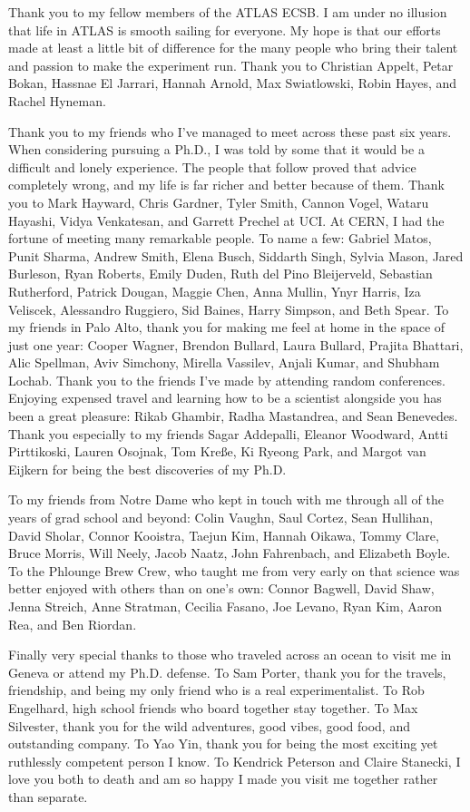 {  Thank you to my fellow members of the ATLAS ECSB.
  I am under no illusion that life in ATLAS is smooth sailing for everyone.
  My hope is that our efforts made at least a little bit of difference for the many people who bring their talent and passion to make the experiment run.
  Thank you to Christian Appelt, Petar Bokan, Hassnae El Jarrari, Hannah Arnold, Max Swiatlowski, Robin Hayes, and Rachel Hyneman.

  Thank you to my friends who I've managed to meet across these past six years.
  When considering pursuing a Ph.D., I was told by some that it would be a difficult and lonely experience.
  The people that follow proved that advice completely wrong, and my life is far richer and better because of them.
  Thank you to Mark Hayward, Chris Gardner, Tyler Smith, Cannon Vogel, Wataru Hayashi, Vidya Venkatesan, and Garrett Prechel at UCI.
  At CERN, I had the fortune of meeting many remarkable people.
  To name a few: Gabriel Matos, Punit Sharma, Andrew Smith, Elena Busch, Siddarth Singh, Sylvia Mason, Jared Burleson, Ryan Roberts, Emily Duden, Ruth del Pino Bleijerveld, Sebastian Rutherford, Patrick Dougan, Maggie Chen, Anna Mullin, Ynyr Harris, Iza Veliscek, Alessandro Ruggiero, Sid Baines, Harry Simpson, and Beth Spear.
  To my friends in Palo Alto, thank you for making me feel at home in the space of just one year: Cooper Wagner, Brendon Bullard, Laura Bullard, Prajita Bhattari, Alic Spellman, Aviv Simchony, Mirella Vassilev, Anjali Kumar, and Shubham Lochab.
  Thank you to the friends I've made by attending random conferences.
  Enjoying expensed travel and learning how to be a scientist alongside you has been a great pleasure: Rikab Ghambir, Radha Mastandrea, and Sean Benevedes.
  Thank you especially to my friends Sagar Addepalli, Eleanor Woodward, Antti Pirttikoski, Lauren Osojnak, Tom Kreße, Ki Ryeong Park, and Margot van Eijkern for being the best discoveries of my Ph.D.

  To my friends from Notre Dame who kept in touch with me through all of the years of grad school and beyond: Colin Vaughn, Saul Cortez, Sean Hullihan, David Sholar, Connor Kooistra, Taejun Kim, Hannah Oikawa, Tommy Clare, Bruce Morris, Will Neely, Jacob Naatz, John Fahrenbach, and Elizabeth Boyle.
  To the Phlounge Brew Crew, who taught me from very early on that science was better enjoyed with others than on one's own: Connor Bagwell, David Shaw, Jenna Streich, Anne Stratman, Cecilia Fasano, Joe Levano, Ryan Kim, Aaron Rea, and Ben Riordan.

  Finally very special thanks to those who traveled across an ocean to visit me in Geneva or attend my Ph.D. defense.
  To Sam Porter, thank you for the travels, friendship, and being my only friend who is a real experimentalist.
  To Rob Engelhard, high school friends who board together stay together.
  To Max Silvester, thank you for the wild adventures, good vibes, good food, and outstanding company.
  To Yao Yin, thank you for being the most exciting yet ruthlessly competent person I know.
  To Kendrick Peterson and Claire Stanecki, I love you both to death and am so happy I made you visit me together rather than separate.

}
